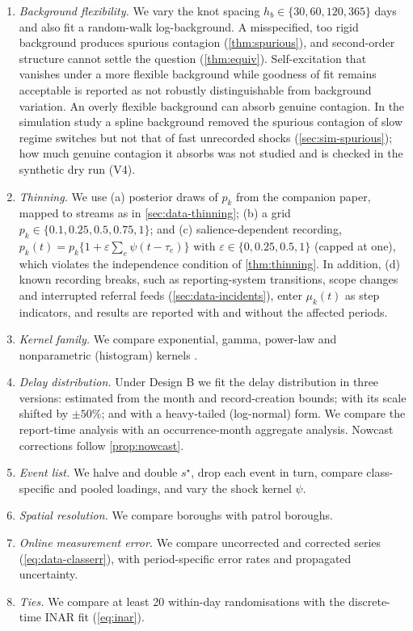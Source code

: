 \begin{enumerate}[S1.]
  \item \emph{Background flexibility.} We vary the knot spacing
  $h_b\in\{30,60,120,365\}$ days and also fit a random-walk log-background.
  A misspecified, too rigid background produces spurious contagion
  (\cref{thm:spurious}), and second-order structure cannot settle the
  question (\cref{thm:equiv}). Self-excitation that vanishes under a more
  flexible background while goodness of fit remains acceptable is reported
  as not robustly distinguishable from background variation. An overly
  flexible background can absorb genuine contagion. In the simulation study a
  spline background removed the spurious contagion of slow regime switches but
  not that of fast unrecorded shocks (\cref{sec:sim-spurious}); how much
  genuine contagion it absorbs was not studied and is checked in the
  synthetic dry run (V4).
  \item \emph{Thinning.} We use (a) posterior draws of $p_k$ from the
  companion paper, mapped to streams as in \cref{sec:data-thinning}; (b) a
  grid $p_k\in\{0.1,0.25,0.5,0.75,1\}$; and (c) salience-dependent recording,
  $p_k(t)=p_k\{1+\varepsilon\sum_e\psi(t-\tau_e)\}$ with
  $\varepsilon\in\{0,0.25,0.5,1\}$ (capped at one), which violates the
  independence condition of \cref{thm:thinning}. In addition, (d) known
  recording breaks, such as reporting-system transitions, scope changes and
  interrupted referral feeds (\cref{sec:data-incidents}), enter $\mu_k(t)$
  as step indicators, and results are reported with and without the
  affected periods.
  \item \emph{Kernel family.} We compare exponential, gamma, power-law and
  nonparametric (histogram) kernels \citep{marsan2008}.
  \item \emph{Delay distribution.} Under Design B we fit the delay
  distribution in three versions: estimated from the month and
  record-creation bounds; with its scale shifted by $\pm50\%$; and with a
  heavy-tailed (log-normal) form. We compare the report-time analysis with
  an occurrence-month aggregate analysis. Nowcast corrections follow
  \cref{prop:nowcast}.
  \item \emph{Event list.} We halve and double $s^\star$, drop each event in
  turn, compare class-specific and pooled loadings, and vary the shock
  kernel $\psi$.
  \item \emph{Spatial resolution.} We compare boroughs with patrol boroughs.
  \item \emph{Online measurement error.} We compare uncorrected and corrected
  series (\cref{eq:data-classerr}), with period-specific error rates and
  propagated uncertainty.
  \item \emph{Ties.} We compare at least 20 within-day randomisations with
  the discrete-time INAR fit (\cref{eq:inar}).
\end{enumerate}

